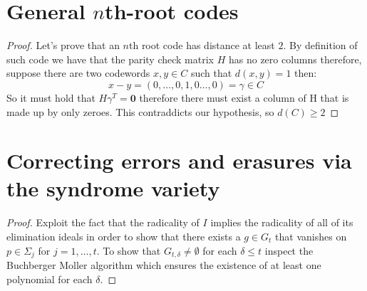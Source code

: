 \documentclass[11pt,a4paper]{report}
\theoremstyle{plain}
\theoremstyle{definition}
\begin{document}
\chapter{General $n$th-root codes}

\begin{rem-hand}[7.1.2]
\end{rem-hand}
\begin{proof}
	Let's prove that an $n$th root code has distance at least $2$. By definition of such code we have that the parity check matrix $H$ has no zero columns therefore, suppose there are two codewords $x,y \in C$ such that $d(x,y) = 1$ then:
	\[
		x-y = (0,\ldots,0,1,0\ldots,0) = \gamma \in C	
	\]
	So it must hold that $H\gamma^T = \textbf{0}$ therefore there must exist a column of  H that is made up by only zeroes. This contraddicts our hypothesis, so $d(C) \ge 2$
\end{proof}

\chapter{Correcting errors and erasures via the syndrome variety}

\begin{lem-hand}[5.1]
\end{lem-hand}
\begin{proof}
	Exploit the fact that the radicality of $I$ implies the radicality of all of its elimination ideals in order to show that there exists a $g \in G_t$ that vanishes on $p \in \Sigma_j$ for $j = 1,\ldots,t$.
	To show that $G_{t,\delta} \ne \emptyset$ for each $\delta \le t$ inspect the Buchberger Moller algorithm which ensures the existence of at least one polynomial for each $\delta$.
\end{proof}
\end{document}
